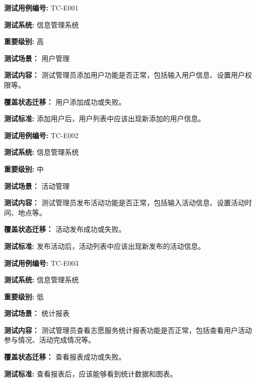 \begin{framed} \textbf{测试用例编号:} TC-E001

\textbf{测试系统:} 信息管理系统

\textbf{重要级别:} 高

\textbf{测试场景：} 用户管理

\textbf{测试内容：} 测试管理员添加用户功能是否正常，包括输入用户信息、设置用户权限等。

\textbf{覆盖状态迁移：} 用户添加成功或失败。

\textbf{测试标准:} 添加用户后，用户列表中应该出现新添加的用户信息。

\begin{center}  \end{center} \end{framed}

\begin{framed} \textbf{测试用例编号:} TC-E002

\textbf{测试系统:} 信息管理系统

\textbf{重要级别:} 中

\textbf{测试场景：} 活动管理

\textbf{测试内容：} 测试管理员发布活动功能是否正常，包括输入活动信息、设置活动时间、地点等。

\textbf{覆盖状态迁移：} 活动发布成功或失败。

\textbf{测试标准:} 发布活动后，活动列表中应该出现新发布的活动信息。

\begin{center}  \end{center} \end{framed}

\begin{framed} \textbf{测试用例编号:} TC-E003

\textbf{测试系统:} 信息管理系统

\textbf{重要级别:} 低

\textbf{测试场景：} 统计报表

\textbf{测试内容：} 测试管理员查看志愿服务统计报表功能是否正常，包括查看用户活动参与情况、活动完成情况等。

\textbf{覆盖状态迁移：} 查看报表成功或失败。

\textbf{测试标准:} 查看报表后，应该能够看到统计数据和图表。

\begin{center}  \end{center} \end{framed}

